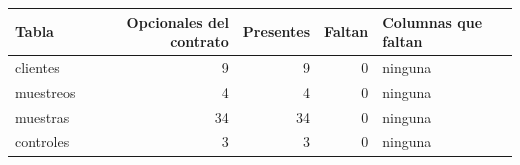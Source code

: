 \begin{tabular}{lrrrl}
\toprule
Tabla & Opcionales del contrato & Presentes & Faltan & Columnas que faltan \\
\midrule
clientes & 9 & 9 & 0 & ninguna \\
muestreos & 4 & 4 & 0 & ninguna \\
muestras & 34 & 34 & 0 & ninguna \\
controles & 3 & 3 & 0 & ninguna \\
\bottomrule
\end{tabular}
